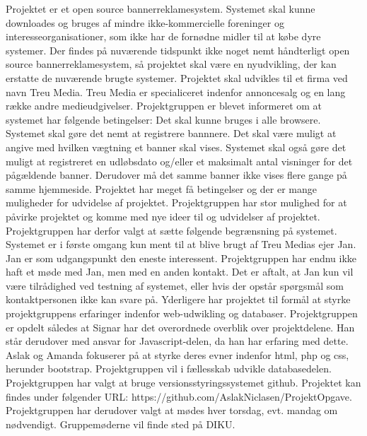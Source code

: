 \documentclass[a4paper,12pt]{article}
\begin{document}
Projektet er et open source bannerreklamesystem. Systemet skal kunne downloades og bruges af mindre ikke-kommercielle foreninger og interesseorganisationer, som ikke har de fornødne midler til at købe dyre systemer. Der findes på nuværende tidspunkt ikke noget nemt håndterligt open source bannerreklamesystem, så projektet skal være en nyudvikling, der kan erstatte de nuværende brugte systemer. Projektet skal udvikles til et firma ved navn Treu Media. Treu Media er specialiceret indenfor annoncesalg og en lang række andre medieudgivelser. 
\newline
\newline
Projektgruppen er blevet informeret om at systemet har følgende betingelser: Det skal kunne bruges i alle browsere. Systemet skal gøre det nemt at registrere bannnere. Det skal være muligt at angive med hvilken vægtning et banner skal vises. Systemet skal også gøre det muligt at registreret en udløbsdato og/eller et maksimalt antal visninger for det pågældende banner. Derudover må det samme banner ikke vises flere gange på samme hjemmeside. 
Projektet har meget få betingelser og der er mange muligheder for udvidelse af projektet. Projektgruppen har stor mulighed for at påvirke projektet og komme med nye ideer til og udvidelser af projektet.
Projektgruppen har derfor valgt at sætte følgende begrænsning på systemet. Systemet er i første omgang kun ment til at blive brugt af Treu Medias ejer Jan. Jan er som udgangspunkt den eneste interessent.
\newline
\newline
Projektgruppen har endnu ikke haft et møde med Jan, men med en anden kontakt. Det er aftalt, at Jan kun vil være tilrådighed ved testning af systemet, eller hvis der opstår spørgsmål som kontaktpersonen ikke kan svare på. 
\newline
\newline
Yderligere har projektet til formål at styrke projektgruppens erfaringer indenfor web-udwikling og databaser.
Projektgruppen er opdelt således at Signar har det overordnede overblik over projektdelene. Han står derudover med ansvar for Javascript-delen, da han har erfaring med dette. Aslak og Amanda fokuserer på at styrke deres evner indenfor html, php og css, herunder bootstrap. Projektgruppen vil i fællesskab udvikle databasedelen.
\newline
\newline
Projektgruppen har valgt at bruge versionsstyringssystemet github. 
Projektet kan findes under følgender URL: https://github.com/AslakNiclasen/ProjektOpgave. Projektgruppen har derudover valgt at mødes hver torsdag, evt. mandag om nødvendigt. Gruppemøderne vil finde sted på DIKU. 
\newline
\newline 
\end{document}
